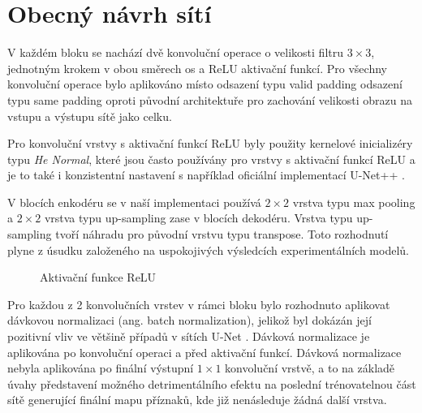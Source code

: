 \section{Obecný návrh sítí}
\label{sec:Chapter42}
V každém bloku se nachází dvě konvoluční operace o velikosti filtru $3\times3$, jednotným krokem v obou směrech os a ReLU aktivační funkcí. Pro všechny konvoluční operace bylo aplikováno místo odsazení typu valid padding odsazení typu same padding oproti původní architektuře \cite{unet} pro zachování velikosti obrazu na vstupu a výstupu sítě jako celku.

Pro konvoluční vrstvy s aktivační funkcí ReLU byly použity kernelové inicializéry typu \textit{He Normal}, které jsou často používány pro vrstvy s aktivační funkcí ReLU \cite{relu_henormal} a je to také i konzistentní nastavení s například oficiální implementací U-Net++ \cite{unetpp_github}. 

V blocích enkodéru se v naší implementaci používá $2\times2$ vrstva typu max pooling a $2\times2$ vrstva typu up-sampling zase v blocích dekodéru. Vrstva typu up-sampling tvoří náhradu pro původní vrstvu typu transpose. Toto rozhodnutí plyne z úsudku založeného na uspokojivých výsledcích experimentálních modelů. 

\begin{figure}[ht]
    \centering
    \caption[Aktivační funkce ReLU]{Aktivační funkce ReLU}
    \label{fig:relu}
\end{figure}

Pro každou z 2 konvolučních vrstev v rámci bloku bylo rozhodnuto aplikovat dávkovou normalizaci (ang. batch normalization), jelikož byl dokázán její pozitivní vliv ve většině případů v sítích U-Net \cite{unetnormalization}. Dávková normalizace je aplikována po konvoluční operaci a před aktivační funkcí. Dávková normalizace nebyla aplikována po finální výstupní $1\times1$ konvoluční vrstvě, a to na základě úvahy představení možného detrimentálního efektu na poslední trénovatelnou část sítě generující finální mapu příznaků, kde již nenásleduje žádná další vrstva.


